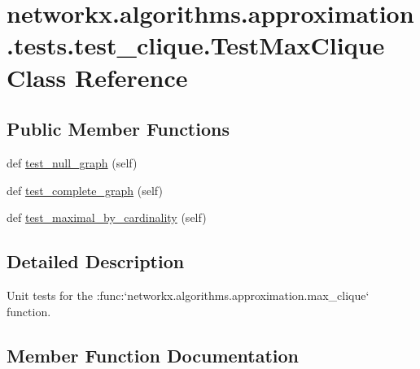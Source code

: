 \hypertarget{classnetworkx_1_1algorithms_1_1approximation_1_1tests_1_1test__clique_1_1TestMaxClique}{}\section{networkx.\+algorithms.\+approximation.\+tests.\+test\+\_\+clique.\+Test\+Max\+Clique Class Reference}
\label{classnetworkx_1_1algorithms_1_1approximation_1_1tests_1_1test__clique_1_1TestMaxClique}
\subsection*{Public Member Functions}
\begin{DoxyCompactItemize}
\item 
def \hyperlink{classnetworkx_1_1algorithms_1_1approximation_1_1tests_1_1test__clique_1_1TestMaxClique_a260d2321a9263a582b554a2cb23953d4}{test\+\_\+null\+\_\+graph} (self)
\item 
def \hyperlink{classnetworkx_1_1algorithms_1_1approximation_1_1tests_1_1test__clique_1_1TestMaxClique_a496318cb6222d8afff9169d71ab1e92d}{test\+\_\+complete\+\_\+graph} (self)
\item 
def \hyperlink{classnetworkx_1_1algorithms_1_1approximation_1_1tests_1_1test__clique_1_1TestMaxClique_a899f6dce8e1651938620ecb5a07096e2}{test\+\_\+maximal\+\_\+by\+\_\+cardinality} (self)
\end{DoxyCompactItemize}


\subsection{Detailed Description}
\begin{DoxyVerb}Unit tests for the :func:`networkx.algorithms.approximation.max_clique`
function.\end{DoxyVerb}
 

\subsection{Member Function Documentation}
\mbox{\label{classnetworkx_1_1algorithms_1_1approximation_1_1tests_1_1test__clique_1_1TestMaxClique_a496318cb6222d8afff9169d71ab1e92d}} 
